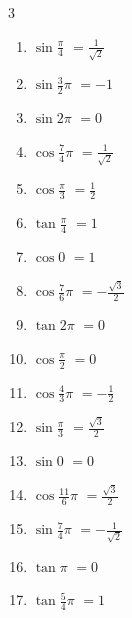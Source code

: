 \begin{multicols}{3}
\begin{enumerate}
  \item $\displaystyle \sin{\frac{\pi}{4}}$
        $\displaystyle =\frac{1}{\sqrt{2}}$

  \item $\displaystyle \sin{\frac{3}{2}\pi}$
        $\displaystyle =-1$

  \item $\displaystyle \sin{2\pi}$
        $\displaystyle =0$

  \item $\displaystyle \cos{\frac{7}{4}\pi}$
        $\displaystyle =\frac{1}{\sqrt{2}}$

  \item $\displaystyle \cos{\frac{\pi}{3}}$
        $\displaystyle =\frac{1}{2}$

  \item $\displaystyle \tan{\frac{\pi}{4}}$
        $\displaystyle =1$

  \item $\displaystyle \cos{0}$
        $\displaystyle =1$

  \item $\displaystyle \cos{\frac{7}{6}\pi}$
        $\displaystyle =-\frac{\sqrt{3}}{2}$

  \item $\displaystyle \tan{2\pi}$
        $\displaystyle =0$

  \item $\displaystyle \cos{\frac{\pi}{2}}$
        $\displaystyle =0$

  \item $\displaystyle \cos{\frac{4}{3}\pi}$
        $\displaystyle =-\frac{1}{2}$

  \item $\displaystyle \sin{\frac{\pi}{3}}$
        $\displaystyle =\frac{\sqrt{3}}{2}$

  \item $\displaystyle \sin{0}$
        $\displaystyle =0$

  \item $\displaystyle \cos{\frac{11}{6}\pi}$
        $\displaystyle =\frac{\sqrt{3}}{2}$

  \item $\displaystyle \sin{\frac{7}{4}\pi}$
        $\displaystyle =-\frac{1}{\sqrt{2}}$

  \item $\displaystyle \tan{\pi}$
        $\displaystyle =0$

  \item $\displaystyle \tan{\frac{5}{4}\pi}$
        $\displaystyle =1$


\end{enumerate}
\end{multicols}
